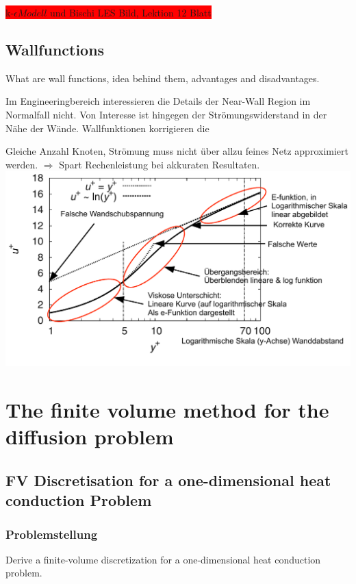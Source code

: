 \documentclass[a4paper]{scrartcl}
\begin{document}
\colorbox{red}{k-$\epsilon Modell$ und Bischi LES Bild, Lektion 12 Blatt}


\subsection{Wallfunctions} 
What are wall functions, idea behind them, advantages
and disadvantages.

Im Engineeringbereich interessieren die Details der Near-Wall Region im
Normalfall nicht. Von Interesse ist hingegen der Strömungswiderstand in der Nähe
der Wände. Wallfunktionen korrigieren die

Gleiche Anzahl Knoten, Strömung muss nicht über allzu feines Netz approximiert
werden. $\Rightarrow$ Spart Rechenleistung bei akkuraten Resultaten.\\

\includegraphics[scale=0.8]{images/wall_function.pdf}

\section{The finite volume method for the diffusion problem}


\subsection{FV Discretisation for a one-dimensional heat conduction Problem}
\subsubsection{Problemstellung}
Derive a finite-volume discretization for a one-dimensional heat conduction
problem. 
\end{document}
